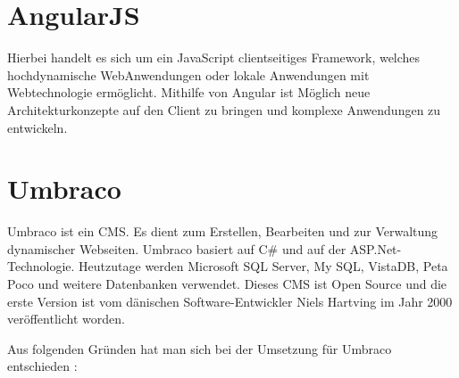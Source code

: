 \section{AngularJS}

Hierbei handelt es sich um ein JavaScript clientseitiges Framework, welches hochdynamische WebAnwendungen oder lokale Anwendungen mit Webtechnologie ermöglicht. Mithilfe von Angular ist Möglich neue Architekturkonzepte auf den Client zu bringen und komplexe Anwendungen zu entwickeln. \cite {Gechev2017}

\section{Umbraco}


Umbraco ist ein \ac{CMS}. Es dient zum Erstellen, Bearbeiten und zur Verwaltung dynamischer Webseiten. Umbraco basiert auf C\#  und auf der ASP.Net-Technologie. Heutzutage werden Microsoft SQL Server, My SQL, VistaDB, Peta Poco und weitere Datenbanken verwendet. Dieses CMS ist Open Source und die erste Version ist vom dänischen Software-Entwickler Niels Hartving im Jahr 2000 veröffentlicht worden. 

Aus folgenden Gründen hat man sich bei der Umsetzung für Umbraco entschieden \cite {UmracoHQ2018}:


